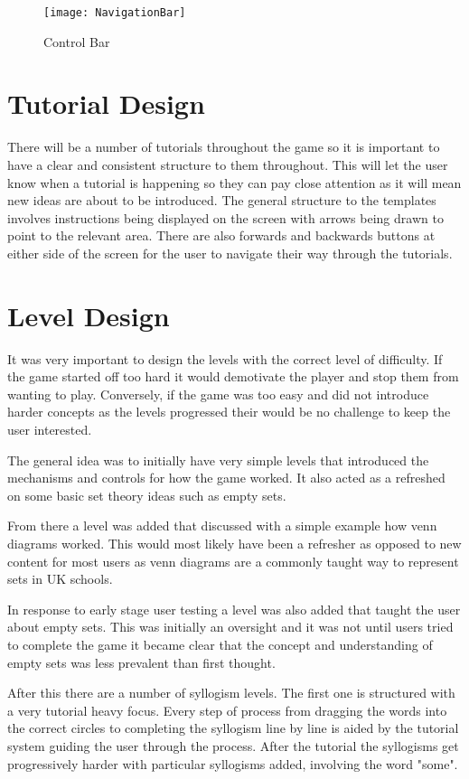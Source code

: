 \documentclass[12pt,a4paper]{report}
\begin{document}
\begin{figure}[h]
\centering
    \texttt{[image: NavigationBar]}
    \caption{Control Bar}
    \label{fig:floodFillBad}
\end{figure}
\FloatBarrier

\section{Tutorial Design}
There will be a number of tutorials throughout the game so it is important to have a clear and consistent structure to them throughout. This will let the user know when a tutorial is happening so they can pay close attention as it will mean new ideas are about to be introduced. The general structure to the templates involves instructions being displayed on the screen with arrows being drawn to point to the relevant area. There are also forwards and backwards buttons at either side of the screen for the user to navigate their way through the tutorials. 

\section{Level Design}
It was very important to design the levels with the correct level of difficulty. If the game started off too hard it would demotivate the player and stop them from wanting to play. Conversely, if the game was too easy and did not introduce harder concepts as the levels progressed their would be no challenge to keep the user interested.

The general idea was to initially have very simple levels that introduced the mechanisms and controls for how the game worked. It also acted as a refreshed on some basic set theory ideas such as empty sets. 

From there a level was added that discussed with a simple example how venn diagrams worked. This would most likely have been a refresher as opposed to new content for most users as venn diagrams are a commonly taught way to represent sets in UK schools.

In response to early stage user testing a level was also added that taught the user about empty sets. This was initially an oversight and it was not until users tried to complete the game it became clear that the concept and understanding of empty sets was less prevalent than first thought.

After this there are a number of syllogism levels. The first one is structured with a very tutorial heavy focus. Every step of process from dragging the words into the correct circles to completing the syllogism line by line is aided by the tutorial system guiding the user through the process. After the tutorial the syllogisms get progressively harder with particular syllogisms added, involving the word "some".
\end{document}

